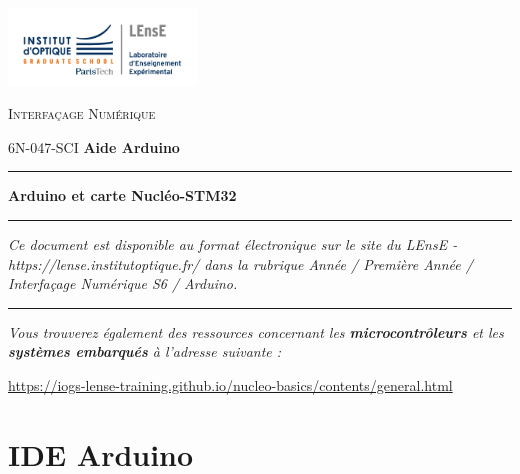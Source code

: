 \documentclass[a4paper,11pt,titlepage]{article} %
\begin{document}
\newpage
\pagestyle{empty}
\strut


\newpage
\pagestyle{plain}
\setcounter{page}{1}

\begin{minipage}[c]{.25\linewidth}
	\includegraphics[width=5cm]{images/Logo-LEnsE.png}
\end{minipage} \hfill
\begin{minipage}[c]{.4\linewidth}

\begin{center}
\vspace{0.3cm}
{\Large \textsc{Interfaçage Numérique}}

\medskip

6N-047-SCI \qquad \textbf{\large Aide Arduino}

\end{center}
\end{minipage}\hfill

\vspace{0.5cm}

\noindent \rule{\linewidth}{1pt}

{\noindent\Large  \rule[-7pt]{0pt}{30pt} \textbf{Arduino et carte Nucléo-STM32}}

\noindent \rule{\linewidth}{1pt}

\bigskip 

\textit{Ce document est disponible au format électronique sur le site du LEnsE - https://lense.institutoptique.fr/ dans la rubrique Année / Première Année / Interfaçage Numérique S6 / Arduino.}

\noindent \rule{\linewidth}{1pt}

\textit{Vous trouverez également des ressources concernant les \textbf{microcontrôleurs} et les \textbf{systèmes embarqués} à l'adresse suivante :}

\href{https://iogs-lense-training.github.io/nucleo-basics/contents/general.html}{https://iogs-lense-training.github.io/nucleo-basics/contents/general.html}

\section{IDE Arduino}
\end{document}

